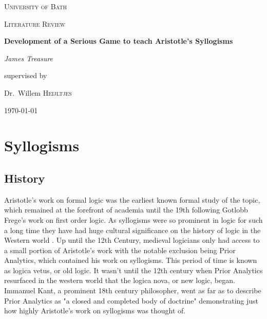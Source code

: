 \documentclass[12pt,a4paper]{report}
\begin{document}
\begin{titlepage}
	\centering
	{\scshape\LARGE University of Bath \par}
	\vspace{1cm}
	{\scshape\Large Literature Review\par}
	\vspace{1.5cm}
	{\huge\bfseries Development of a Serious Game to teach Aristotle's Syllogisms\par}
	\vspace{2cm}
	{\Large\itshape James Treasure\par}
	\vfill
	supervised by\par
	Dr.~Willem \textsc{Heijltjes}
	\vfill
	{\large \today\par}
\end{titlepage}

\tableofcontents
\chapter{Syllogisms}
\section{History}

Aristotle's work on formal logic was the earliest known formal study of the topic, which remained at the forefront of academia until the 19th following Gotlobb Frege's work on first order logic. As syllogisms were so prominent in logic for such a long time they have had huge cultural significance on the history of logic in the Western world \citep{sep-aristotle-logic}. Up until the 12th Century, medieval logicians only had access to a small portion of Aristotle's work with the notable exclusion being Prior Analytics, which contained his work on syllogisms. This period of time is known as logica vetus, or old logic. It wasn't until the 12th century when Prior Analytics resurfaced in the western world that the logica nova, or new logic, began. Immanuel Kant, a prominent 18th century philosopher, went as far as to describe Prior Analytics as "a closed and completed body of doctrine" demonstrating just how highly Aristotle's work on syllogisms was thought of.
\end{document}
